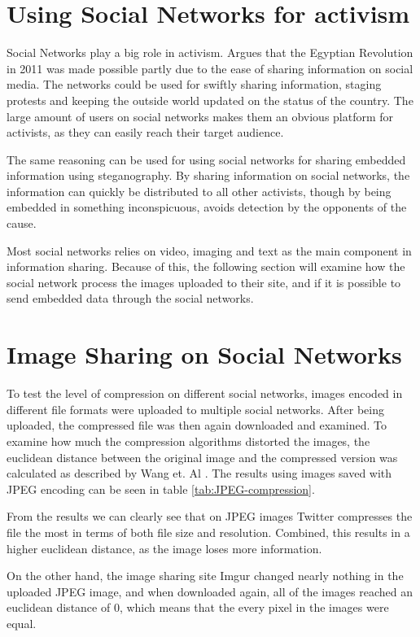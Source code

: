 \clearpage
\section{Using Social Networks for activism}
Social Networks play a big role in activism. 
\citep{IJoC1242} Argues that the Egyptian Revolution in 2011 was made possible partly due to the ease of sharing information on social media. 
The networks could be used for swiftly sharing information, staging protests and keeping the outside world updated on the status of the country.
The large amount of users on social networks makes them an obvious platform for activists, as they can easily reach their target audience. 

The same reasoning can be used for using social networks for sharing embedded information using steganography. 
By sharing information on social networks, the information can quickly be distributed to all other activists, though by being embedded in something inconspicuous, avoids detection by the opponents of the cause.

Most social networks relies on video, imaging and text as the main component in information sharing.
Because of this, the following section will examine how the social network process the images uploaded to their site, and if it is possible to send embedded data through the social networks.

\section{Image Sharing on Social Networks}

To test the level of compression on different social networks, images encoded in different file formats were uploaded to multiple social networks. 
After being uploaded, the compressed file was then again downloaded and examined.
To examine how much the compression algorithms distorted the images, the euclidean distance between the original image and the compressed version was calculated as described by Wang et. Al \citep{Wang2005}.
The results using images saved with JPEG encoding can be seen in table \ref{tab:JPEG-compression}. 

From the results we can clearly see that on JPEG images Twitter compresses the file the most in terms of both file size and resolution.
Combined, this results in a higher euclidean distance, as the image loses more information. 

On the other hand, the image sharing site Imgur changed nearly nothing in the uploaded JPEG image, and when downloaded again, all of the images reached an euclidean distance of 0, which means that the every pixel in the images were equal.

